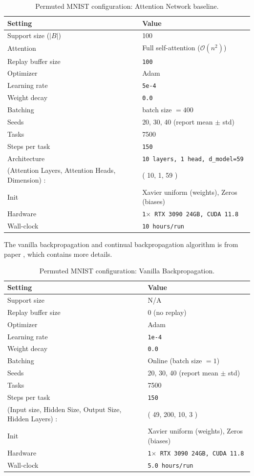 \documentclass{article}
\begin{document}
\begin{table}[H]
\centering
\footnotesize
\caption{Permuted MNIST configuration: Attention Network baseline.}
\label{tab:pmnist_attention}
\begin{tabular}{@{}ll@{}}
\toprule
Setting & Value \\ \midrule
Support size ($|B|$) & 100 \\
Attention & Full self-attention ($\mathcal{O}(n^2)$) \\
Replay buffer size & \texttt{100} \\
Optimizer & Adam \\
Learning rate & \texttt{5e-4} \\
Weight decay & \texttt{0.0} \\
Batching & batch size $=400$ \\
Seeds & 20, 30, 40 (report mean $\pm$ std) \\
Tasks & 7500 \\
Steps per task & \texttt{150} \\
Architecture & \texttt{10 layers, 1 head, d\_model=59} \\
(Attention Layers, Attention Heads, Dimension) : & ( 10, 1, 59 ) \\ 
Init & Xavier uniform (weights), Zeros (biases) \\
Hardware & \texttt{1$\times$ RTX 3090 24GB, CUDA 11.8} \\
Wall-clock & \texttt{10 hours/run} \\
\bottomrule
\end{tabular}
\end{table}

The vanilla backpropagation and continual backpropagation algorithm is from paper \citep{dohare2024loss}, which contains more details.

\begin{table}[H]
\centering
\footnotesize
\caption{Permuted MNIST configuration: Vanilla Backpropagation.}
\label{tab:pmnist_bp}
\begin{tabular}{@{}ll@{}}
\toprule
Setting & Value \\ \midrule
Support size & N/A \\
Replay buffer size & 0 (no replay) \\
Optimizer & Adam \\
Learning rate & \texttt{1e-4} \\
Weight decay & \texttt{0.0} \\
Batching & Online (batch size $=1$) \\
Seeds & 20, 30, 40 (report mean $\pm$ std) \\
Tasks & 7500 \\
Steps per task & \texttt{150} \\
(Input size, Hidden Size, Output Size, Hidden Layers) : & ( 49, 200, 10, 3 ) \\ 
Init &  Xavier uniform (weights), Zeros (biases) \\
Hardware & \texttt{1$\times$ RTX 3090 24GB, CUDA 11.8} \\
Wall-clock & \texttt{5.0 hours/run} \\
\bottomrule
\end{tabular}
\end{table}
\end{document}
